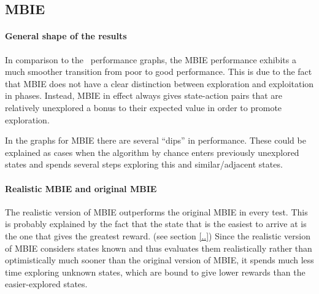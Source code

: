 \subsection{MBIE }
\paragraph{General shape of the results} In comparison to the \etre\ performance graphs, the MBIE performance exhibits a much smoother transition from poor to good performance. This is due to the fact that MBIE does not have a clear distinction between exploration and exploitation in phases. Instead, MBIE in effect always gives state-action pairs that are relatively unexplored a bonus to their expected value in order to promote exploration.  

In the graphs for MBIE there are several ``dips'' in performance. These could be explained as cases when the algorithm by chance enters previously unexplored states and spends several steps exploring this and similar/adjacent states. 

\paragraph{Realistic MBIE and original MBIE}
The realistic version of MBIE outperforms the original MBIE in every test. This is probably explained by the fact that the state that is the easiest to arrive at is the one that gives the greatest reward. (see section \ref{..})  Since the realistic version of MBIE considers states known and thus evaluates them  realistically rather than optimistically much sooner than the original version of MBIE, it spends much less time exploring unknown states, which are bound to give lower rewards than the easier-explored states. 


